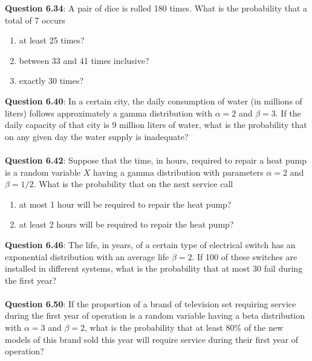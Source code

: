 \documentclass{article}
\begin{document}
    \noindent\textbf{Question 6.34}: A pair of dice is rolled 180 times. What is the
    probability that a total of 7 occurs
        \begin{enumerate}[label = (\alph*) ]
            \item at least 25 times?
            \item between 33 and 41 times inclusive?
            \item exactly 30 times?
        \end{enumerate}

    \noindent\textbf{Question 6.40}: In a certain city, the daily consumption of water
    (in millions of liters) follows approximately a gamma distribution with 
    $\alpha = 2$ and $\beta = 3$. If the daily capacity of that city is 9 
    million liters of water, what is the probability that on any given day 
    the water supply is inadequate?\\\\

    \noindent\textbf{Question 6.42}: Suppose that the time, in hours, required to
    repair a heat pump is a random variable $X$ having a gamma distribution 
    with parameters $\alpha = 2$ and $\beta = 1/2$. What is the probability 
    that on the next service call
        \begin{enumerate}[label = (\alph*) ]
            \item at most 1 hour will be required to repair the heat pump?
            \item at least 2 hours will be required to repair the heat pump?
        \end{enumerate}

    \noindent\textbf{Question 6.46}: The life, in years, of a certain type of electrical
    switch has an exponential distribution with an average life $\beta = 2$. If 100 of 
    these switches are installed in different systems, what is the probability that at 
    most 30 fail during the first year?\\\\
    
    \noindent\textbf{Question 6.50}: If the proportion of a brand of television set 
    requiring service during the first year of operation is a random variable having 
    a beta distribution with $\alpha = 3$ and $\beta = 2$, what is the probability 
    that at least 80\% of the new models of this brand sold this year will require
    service during their first year of operation?\\\\
    
\end{document}
